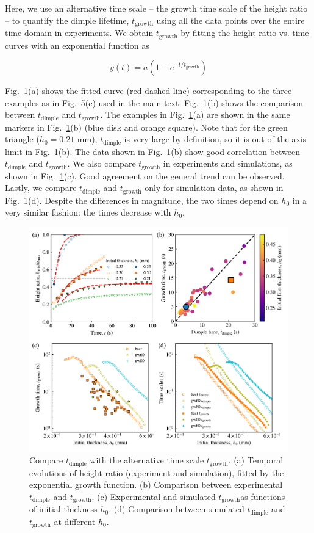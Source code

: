 \documentclass[11pt]{article}
\begin{document}
Here, we use an alternative time scale – the growth time scale of the height ratio – to quantify the dimple lifetime, $t_\mathrm{growth}$ using all the data points over the entire time domain in experiments. We obtain $t_\mathrm{growth}$ by fitting the height ratio vs. time curves with an exponential function as 

\begin{equation}
     y(t) = a(1-e^{-t/t_\mathrm{growth}})
\end{equation}

Fig.~\ref{fig:dimple-growth-time}(a) shows the fitted curve (red dashed line) corresponding to the three examples as in Fig.~5(c) used in the main text. Fig.~\ref{fig:dimple-growth-time}(b) shows the comparison between $t_\mathrm{dimple}$ and $t_\mathrm{growth}$. 
The examples in Fig.~\ref{fig:dimple-growth-time}(a) are shown in the same markers in Fig.~\ref{fig:dimple-growth-time}(b) (blue disk and orange square). 
Note that for the green triangle ($h_0=0.21$ mm), $t_\mathrm{dimple}$ is very large by definition, so it is out of the axis limit in Fig.~\ref{fig:dimple-growth-time}(b). 
The data shown in Fig.~\ref{fig:dimple-growth-time}(b) show good correlation between $t_\mathrm{dimple}$ and $t_\mathrm{growth}$. 
We also compare $t_\mathrm{growth}$ in experiments and simulations, as shown in Fig.~\ref{fig:dimple-growth-time}(c). 
Good agreement on the general trend can be observed.
Lastly, we compare $t_\mathrm{dimple}$ and $t_\mathrm{growth}$ only for simulation data, as shown in Fig.~\ref{fig:dimple-growth-time}(d). Despite the differences in magnitude, the two times depend on $h_0$ in a very similar fashion: the times decrease with $h_0$.

\begin{figure}[ht]
    \centering
    \includegraphics[width=0.8\linewidth]{dimple_growth_time.png}
    \caption{Compare $t_\mathrm{dimple}$ with the alternative time scale $t_\mathrm{growth}$. (a) Temporal evolutions of height ratio (experiment and simulation), fitted by the exponential growth function. (b) Comparison between experimental $t_\mathrm{dimple}$ and $t_\mathrm{growth}$. (c) Experimental and simulated $t_\mathrm{growth}$as functions of initial thickness $h_0$. (d) Comparison between simulated $t_\mathrm{dimple}$ and $t_\mathrm{growth}$ at different $h_0$.}
    \label{fig:dimple-growth-time}
\end{figure}
\end{document}
